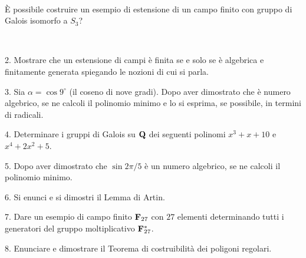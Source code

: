 \ \dotfill\ \bigskip\bigskip\bigskip\vfil

 \`E possibile costruire un esempio di estensione di un campo finito con gruppo di Galois isomorfo
a $S_3$?\medskip\bigskip\bigskip

\ \dotfill\ \bigskip\bigskip\bigskip

\vfil\eject


\item{2.} Mostrare che un estensione di campi \`e finita se e solo se \`e algebrica e finitamente generata spiegando le nozioni di cui si
parla.

\vv


\item{3.} Sia $\alpha=\cos 9^\circ$ (il  coseno di nove gradi). Dopo aver dimostrato che \`e numero algebrico, se ne calcoli il polinomio 
minimo e lo si esprima, se possibile, in termini di radicali. 
\ve\ \vs


\item{4.} Determinare i gruppi di Galois su ${\bf Q}$ dei seguenti polinomi $x^3+x+10$ e $x^4+2x^2+5$.\vv

\item{5.} Dopo aver dimostrato che $\sin2\pi/5$ \`e un numero algebrico, se ne calcoli il polinomio minimo.
\ve\ \vs


\item{6.} Si enunci e si dimostri il Lemma di Artin.\vskip 6cm\bigskip\bigskip\bigskip\vv\vv


\item{7.}  Dare un esempio di campo finito ${\bf F}_{27}$ con $27$
elementi determinando tutti i generatori del gruppo moltiplicativo
${\bf F}_{27}^*$.\vskip 3cm\bigskip\bigskip\bigskip\vv\vv

\item{8.} Enunciare e dimostrare il Teorema di costruibilit\`{a} dei poligoni regolari.\vv

\ \vst
 \bye
